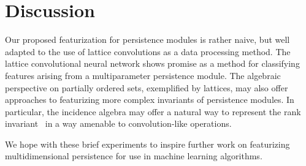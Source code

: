 \documentclass{article}
\begin{document}
\section{Discussion}
Our proposed featurization for persistence modules is rather naive, but well
adapted to the use of lattice convolutions as a data processing method. The
lattice convolutional neural network shows promise as a method for classifying
features arising from a multiparameter persistence module. The algebraic
perspective on partially ordered sets, exemplified by lattices, may also offer
approaches to featurizing more complex invariants of persistence modules. In
particular, the incidence algebra may offer a natural way to represent the rank
invariant~\cite{carlsson_theory_2009} in a way amenable to convolution-like
operations.

We hope with these brief experiments to inspire further work on featurizing
multidimensional persistence for use in machine learning algorithms.



\end{document}
